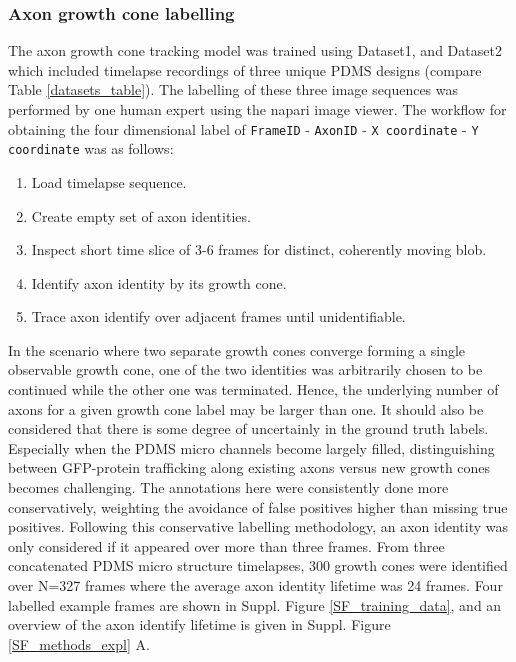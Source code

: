 \subsubsection{Axon growth cone labelling}
The axon growth cone tracking model was trained using Dataset1, and Dataset2
which included timelapse recordings of three unique PDMS designs (compare Table
\ref{datasets_table}). The labelling of these three image sequences was
performed by one human expert using the napari image viewer. The workflow for 
obtaining the four dimensional label of
 \verb|FrameID| - \verb|AxonID| - \verb|X coordinate| - \verb|Y coordinate| was
as follows:
\vspace{2mm}
\begin{enumerate}
    \item Load timelapse sequence.
    \item Create empty set of axon identities.
    \item Inspect short time slice of 3-6 frames for distinct, coherently moving
    blob.
    \item Identify axon identity by its growth cone.
    \item Trace axon identify over adjacent frames until unidentifiable.
\end{enumerate}
\vspace{2mm}
In the scenario where two separate growth cones converge forming a single
observable growth cone, one of the two identities was arbitrarily chosen to be
continued while the other one was terminated. Hence, the underlying number of
axons for a given growth cone label may be larger than one. It should also be
considered that there is some degree of uncertainly in the ground truth labels.
Especially when the PDMS micro channels become largely filled, distinguishing
between GFP-protein trafficking along existing axons versus new growth cones
becomes challenging. The annotations here were consistently done more
conservatively, weighting the avoidance of false positives higher than missing
true positives. Following this conservative labelling methodology, an axon
identity was only considered if it appeared over more than three frames. From
three concatenated PDMS micro structure timelapses, 300 growth cones were
identified over N=327 frames where the average axon identity lifetime was 24
frames.  Four labelled example frames are shown in Suppl. Figure
\ref{SF_training_data}, and an overview of the axon identify lifetime is given
in Suppl. Figure \ref{SF_methods_expl} A.

